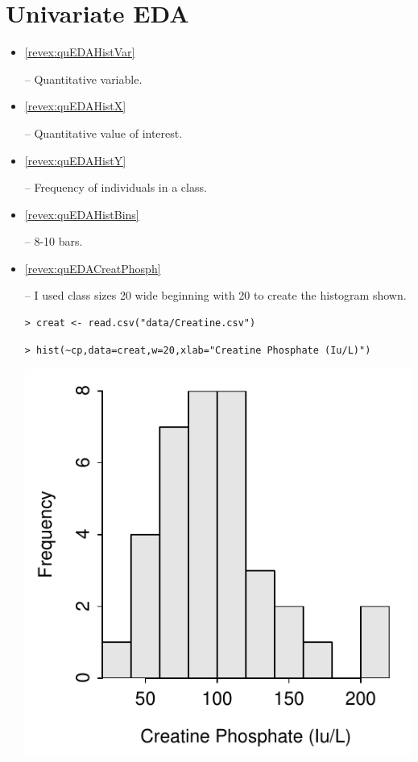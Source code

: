 \documentclass[10pt,openany]{book}\usepackage[]{graphicx}\usepackage[]{color}
\makeatletter
\newenvironment{kframe}{%
 \def\at@end@of@kframe{}%
 \ifinner\ifhmode%
  \def\at@end@of@kframe{\end{minipage}}%
  \begin{minipage}{\columnwidth}%
 \fi\fi%
 \def\FrameCommand##1{\hskip\@totalleftmargin \hskip-\fboxsep
 \colorbox{shadecolor}{##1}\hskip-\fboxsep
     \hskip-\linewidth \hskip-\@totalleftmargin \hskip\columnwidth}%
 \MakeFramed {\advance\hsize-\width
   \@totalleftmargin\z@ \linewidth\hsize
   \@setminipage}}%
 {\par\unskip\endMakeFramed%
 \at@end@of@kframe}
\newenvironment{knitrout}{}{} %
\makeatother
\begin{document}
\section*{Univariate EDA}
\begin{itemize}
  \item \hypertarget{ans:quEDAHistVar}{\ref{revex:quEDAHistVar}} --  Quantitative variable.
  \item \hypertarget{ans:quEDAHistX}{\ref{revex:quEDAHistX}} --  Quantitative value of interest.
  \item \hypertarget{ans:quEDAHistY}{\ref{revex:quEDAHistY}} --  Frequency of individuals in a class.
  \item \hypertarget{ans:quEDAHistBins}{\ref{revex:quEDAHistBins}} --  8-10 bars.
  \item \hypertarget{ans:quEDACreatPhosph}{\ref{revex:quEDACreatPhosph}} -- I used class sizes 20 wide beginning with 20 to create the histogram shown.

\begin{knitrout}
\color{fgcolor}\begin{kframe}
\begin{verbatim}
> creat <- read.csv("data/Creatine.csv")
\end{verbatim}
\end{kframe}
\end{knitrout}
\begin{knitrout}
\color{fgcolor}\begin{kframe}
\begin{verbatim}
> hist(~cp,data=creat,w=20,xlab="Creatine Phosphate (Iu/L)")
\end{verbatim}
\end{kframe}

{\centering \includegraphics[width=.4\linewidth]{Figs/HistCP-1} 

}




\end{knitrout}
\end{itemize}
\end{document}
